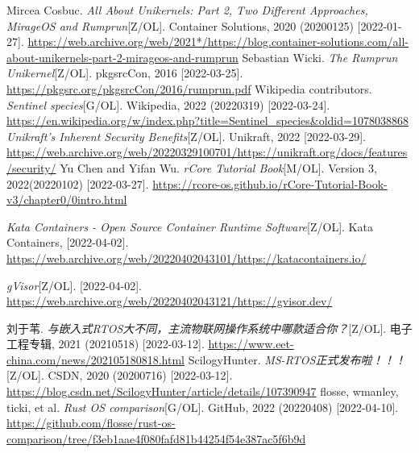 \documentclass{../runikraft-report}
\begin{document}
\begin{thebibliography}{99}
 Mircea Cosbuc. \textit{All About Unikernels: Part 2, Two Different Approaches, MirageOS and Rumprun}[Z/OL]. Container Solutions, 2020 (20200125) [2022-01-27]. \url{https://web.archive.org/web/2021*/https://blog.container-solutions.com/all-about-unikernels-part-2-mirageos-and-rumprun}
 Sebastian Wicki. \textit{The Rumprun Unikernel}[Z/OL]. pkgsrcCon, 2016
[2022-03-25]. \url{https://pkgsrc.org/pkgsrcCon/2016/rumprun.pdf}
 Wikipedia contributors. \textit{Sentinel species}[G/OL]. Wikipedia, 2022 (20220319) [2022-03-24]. \url{https://en.wikipedia.org/w/index.php?title=Sentinel_species&oldid=1078038868}
 \textit{Unikraft's Inherent Security Benefits}[Z/OL]. Unikraft, 2022 [2022-03-29]. \url{https://web.archive.org/web/20220329100701/https://unikraft.org/docs/features/security/}
 Yu Chen and Yifan Wu. \textit{rCore Tutorial Book}[M/OL]. Version 3,
2022(20220102) [2022-03-27]. \url{https://rcore-os.github.io/rCore-Tutorial-Book-v3/chapter0/0intro.html}

 \textit{Kata Containers - Open Source Container Runtime Software}[Z/OL].
Kata Containers, [2022-04-02]. \url{https://web.archive.org/web/20220402043101/https://katacontainers.io/}

 \textit{gVisor}[Z/OL]. [2022-04-02]. \url{https://web.archive.org/web/20220402043121/https://gvisor.dev/}

 刘于苇. \textit{与嵌入式RTOS大不同，主流物联网操作系统中哪款适合你？}[Z/OL].
电子工程专辑, 2021 (20210518) [2022-03-12]. \url{https://www.eet-china.com/news/202105180818.html}
 ScilogyHunter. \textit{MS-RTOS正式发布啦！！！}[Z/OL]. CSDN, 2020 (20200716) [2022-03-12]. \url{https://blog.csdn.net/ScilogyHunter/article/details/107390947}
 flosse, wmanley, ticki, et al. \textit{Rust OS comparison}[G/OL]. GitHub, 2022 (20220408) [2022-04-10]. \url{https://github.com/flosse/rust-os-comparison/tree/f3eb1aae4f080fafd81b44254f54e387ac5f6b9d}
\end{thebibliography}
\end{document}
